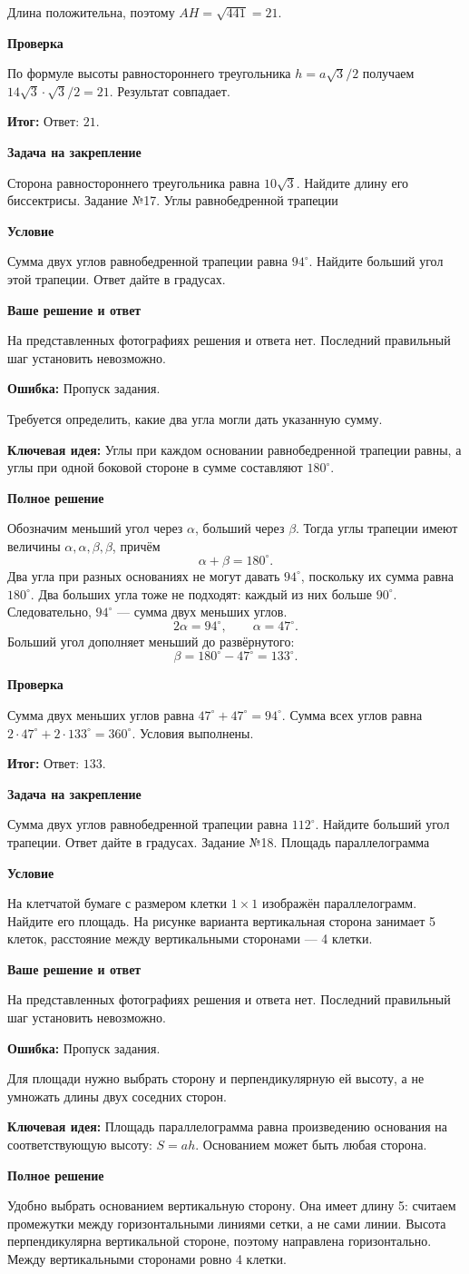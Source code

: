 \documentclass[a4paper,12pt]{article}
\newcommand{\task}[2]{\clearpage\phantomsection\label{task:#1}{\Large\color{darkaccent} Задание №#1. #2}\par\vspace{2mm}{\color{accent}\hrule}\vspace{2mm}}
\newcommand{\sub}[1]{\par\smallskip\textcolor{darkaccent}{\textbf{#1}}\par}
\newcommand{\error}[1]{\par\textcolor{err}{\textbf{Ошибка:}} #1\par}
\newcommand{\idea}[1]{\par\textcolor{darkaccent}{\textbf{Ключевая идея:}} #1\par}
\newcommand{\result}[1]{\par\textcolor{darkaccent}{\textbf{Итог:}} #1\par}
\newcommand{\practice}[1]{\par\medskip{\color{accent}\hrule}\smallskip\textcolor{darkaccent}{\textbf{Задача на закрепление}}\par #1}
\newcommand{\missing}{\sub{Ваше решение и ответ}На представленных фотографиях решения и ответа нет. Последний правильный шаг установить невозможно.}
\begin{document}
Длина положительна, поэтому $AH=\sqrt{441}=21$.
\sub{Проверка}
По формуле высоты равностороннего треугольника $h=a\sqrt{3}/2$ получаем $14\sqrt{3}\cdot\sqrt{3}/2=21$. Результат совпадает.
\result{Ответ: $21$.}
\practice{Сторона равностороннего треугольника равна $10\sqrt{3}$. Найдите длину его биссектрисы.}
\task{17}{Углы равнобедренной трапеции}
\sub{Условие}
Сумма двух углов равнобедренной трапеции равна $94^\circ$. Найдите больший угол этой трапеции. Ответ дайте в градусах.
\missing
\error{Пропуск задания.} Требуется определить, какие два угла могли дать указанную сумму.
\idea{Углы при каждом основании равнобедренной трапеции равны, а углы при одной боковой стороне в сумме составляют $180^\circ$.}
\sub{Полное решение}
Обозначим меньший угол через $\alpha$, больший через $\beta$. Тогда углы трапеции имеют величины $\alpha,\alpha,\beta,\beta$, причём
\[
\alpha+\beta=180^\circ.
\]
Два угла при разных основаниях не могут давать $94^\circ$, поскольку их сумма равна $180^\circ$. Два больших угла тоже не подходят: каждый из них больше $90^\circ$. Следовательно, $94^\circ$ --- сумма двух меньших углов.
\[
2\alpha=94^\circ,\qquad \alpha=47^\circ.
\]
Больший угол дополняет меньший до развёрнутого:
\[
\beta=180^\circ-47^\circ=133^\circ.
\]
\sub{Проверка}
Сумма двух меньших углов равна $47^\circ+47^\circ=94^\circ$. Сумма всех углов равна $2\cdot47^\circ+2\cdot133^\circ=360^\circ$. Условия выполнены.
\result{Ответ: $133$.}
\practice{Сумма двух углов равнобедренной трапеции равна $112^\circ$. Найдите больший угол трапеции. Ответ дайте в градусах.}
\task{18}{Площадь параллелограмма}
\sub{Условие}
На клетчатой бумаге с размером клетки $1\times1$ изображён параллелограмм. Найдите его площадь. На рисунке варианта вертикальная сторона занимает 5 клеток, расстояние между вертикальными сторонами --- 4 клетки.
\missing
\error{Пропуск задания.} Для площади нужно выбрать сторону и перпендикулярную ей высоту, а не умножать длины двух соседних сторон.
\idea{Площадь параллелограмма равна произведению основания на соответствующую высоту: $S=ah$. Основанием может быть любая сторона.}
\sub{Полное решение}
Удобно выбрать основанием вертикальную сторону. Она имеет длину 5: считаем промежутки между горизонтальными линиями сетки, а не сами линии. Высота перпендикулярна вертикальной стороне, поэтому направлена горизонтально. Между вертикальными сторонами ровно 4 клетки.
\begin{center}
\end{center}
\end{document}
